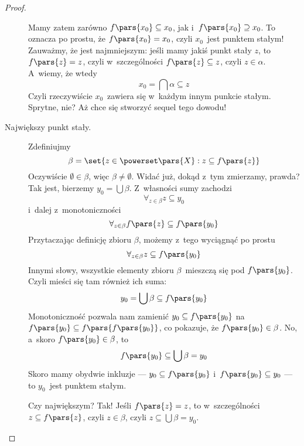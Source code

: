 \begin{proof}
\begin{description}
		      Mamy zatem zarówno \(f\pars{x_0} \subseteq x_0\), jak i~\(f\pars{x_0} \supseteq x_0\). To oznacza po prostu, że \(f\pars{x_0} = x_0\), czyli \(x_0\)~jest punktem stałym! Zauważmy, że jest najmniejszym: jeśli mamy jakiś punkt stały \(z\), to \(f\pars{z} = z\), czyli w~szczególności \(f\pars{z} \subseteq z\), czyli \(z \in \alpha\). A~wiemy, że wtedy
		      \begin{equation*}
			      x_0 = \bigcap \alpha \subseteq z
		      \end{equation*}
		      Czyli rzeczywiście \(x_0\)~zawiera się w~każdym innym punkcie stałym. Sprytne, nie? Aż chce się stworzyć sequel tego dowodu!
		\item[Największy punkt stały.] Zdefiniujmy
		      \begin{equation*}
			      \beta = \set{z \in \powerset\pars{X} : z \subseteq f\pars{z}}
		      \end{equation*}
		      Oczywiście \(\emptyset \in \beta\), więc \(\beta \neq \emptyset\). Widać już, dokąd z~tym zmierzamy, prawda? Tak jest, bierzemy \(y_0 = \bigcup \beta\). Z~własności sumy zachodzi
		      \begin{equation*}
			      \forall_{z \in \beta} z \subseteq y_0
		      \end{equation*}
		      i~dalej z~monotoniczności
		      \begin{equation*}
			      \forall_{z \in \beta} f\pars{z} \subseteq f\pars{y_0}
		      \end{equation*}
		      Przytaczając definicję zbioru \(\beta\), możemy z~tego wyciągnąć po prostu
		      \begin{equation*}
			      \forall_{z \in \beta} z \subseteq f\pars{y_0}
		      \end{equation*}
		      Innymi słowy, wszystkie elementy zbioru \(\beta\)~mieszczą się pod \(f\pars{y_0}\). Czyli mieści się tam również ich suma:
		      \begin{equation*}
			      y_0 = \bigcup \beta \subseteq f\pars{y_0}
		      \end{equation*}
		      Monotoniczność pozwala nam zamienić \(y_0 \subseteq f\pars{y_0}\) na \(f\pars{y_0} \subseteq f\pars{f\pars{y_0}}\), co pokazuje, że \(f\pars{y_0} \in \beta\). No, a~skoro \(f\pars{y_0} \in \beta\), to
		      \begin{equation*}
			      f\pars{y_0} \subseteq \bigcup \beta = y_0
		      \end{equation*}
		      Skoro mamy obydwie inkluzje --- \(y_0 \subseteq f\pars{y_0}\) i~\(f\pars{y_0} \subseteq y_0\) --- to \(y_0\)~jest punktem stałym.

		      Czy największym? Tak! Jeśli \(f\pars{z} = z\), to w~szczególności \(z \subseteq f\pars{z}\), czyli \(z \in \beta\), czyli \(z \subseteq \bigcup \beta = y_0\).
	\end{description}
\end{proof}
